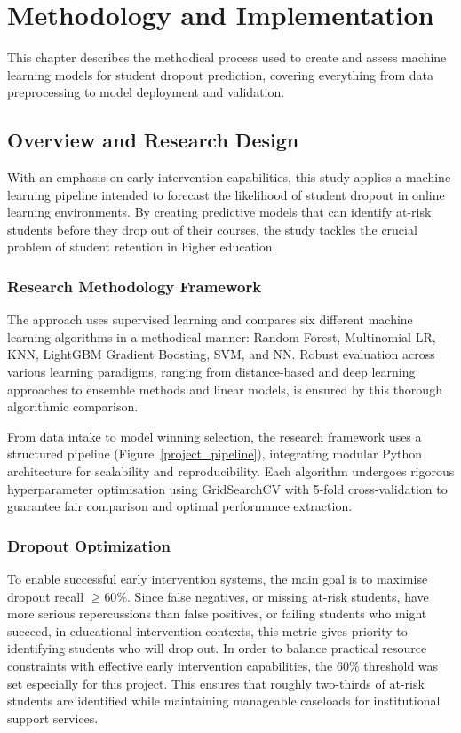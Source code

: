 \documentclass[ %
                    author={Carlos Duran Calle},
                supervisor={Dr. Felipe Campelo},
                    degree={MSc},
                     title={Comparative Machine Learning Analysis for Student Dropout Prediction in a Virtual Learning Environment},
                  subtitle={Incorporating Student Engagement and Socio-Economic Features},
                      type={},
                      year={2025}]{dissertation}
\begin{document}

\chapter{Methodology and Implementation}
\label{chap:execution}

\vspace{1cm} 
\noindent
This chapter describes the methodical process used to create and assess machine learning models for student dropout prediction, covering everything from data preprocessing to model deployment and validation.

\section{Overview and Research Design}
With an emphasis on early intervention capabilities, this study applies a machine learning pipeline intended to forecast the likelihood of student dropout in online learning environments. By creating predictive models that can identify at-risk students before they drop out of their courses, the study tackles the crucial problem of student retention in higher education.

\subsection{Research Methodology Framework}
The approach uses supervised learning and compares six different machine learning algorithms in a methodical manner: Random Forest, Multinomial LR, KNN, LightGBM Gradient Boosting, SVM, and NN.  Robust evaluation across various learning paradigms, ranging from distance-based and deep learning approaches to ensemble methods and linear models, is ensured by this thorough algorithmic comparison.

From data intake to model winning selection, the research framework uses a structured pipeline (Figure~\ref{project_pipeline}), integrating modular Python architecture for scalability and reproducibility.  Each algorithm undergoes rigorous hyperparameter optimisation using GridSearchCV with 5-fold cross-validation to guarantee fair comparison and optimal performance extraction.

\subsection{Dropout Optimization}
To enable successful early intervention systems, the main goal is to maximise dropout recall $\geq60\%$. Since false negatives, or missing at-risk students, have more serious repercussions than false positives, or failing students who might succeed, in educational intervention contexts, this metric gives priority to identifying students who will drop out. In order to balance practical resource constraints with effective early intervention capabilities, the $60\%$ threshold was set especially for this project. This ensures that roughly two-thirds of at-risk students are identified while maintaining manageable caseloads for institutional support services.
\end{document}

